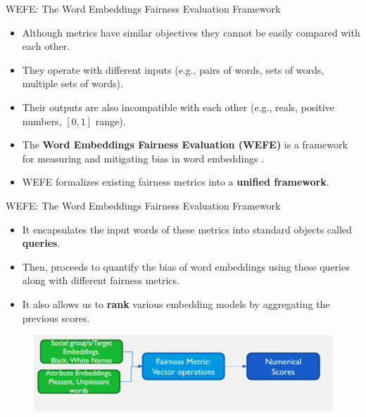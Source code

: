 \documentclass[handout]{beamer}
\begin{document}
\begin{frame}{WEFE: The Word Embeddings Fairness Evaluation Framework}
\begin{scriptsize}
\begin{itemize}
\item Although metrics have similar objectives they cannot be easily compared with each other.
\item They operate with different inputs (e.g., pairs of words, sets of words, multiple sets of words).
\item Their outputs are also incompatible with each other (e.g., reals, positive numbers, $[0,1]$ range).
 \item The \textbf{Word Embeddings Fairness Evaluation (WEFE)} is a framework for measuring and mitigating bias in word embeddings \cite{badilla2020wefe}.

 \item  WEFE formalizes existing fairness metrics into a \textbf{unified framework}.
\end{itemize}

\end{scriptsize}
\end{frame}


\begin{frame}{WEFE: The Word Embeddings Fairness Evaluation Framework}
\begin{scriptsize}
\begin{itemize}

 \item It encapsulates the input words of these metrics into standard objects called \textbf{queries}.
 \item Then, proceeds to quantify the bias of word embeddings using these queries along with different fairness metrics.
 \item It also allows us to \textbf{rank} various embedding models by aggregating the previous scores.
\end{itemize}
  \begin{figure}[h]
        	\includegraphics[scale = 0.3]{pics/wefe.png}
        \end{figure}

\end{scriptsize}
\end{frame}
\end{document}
